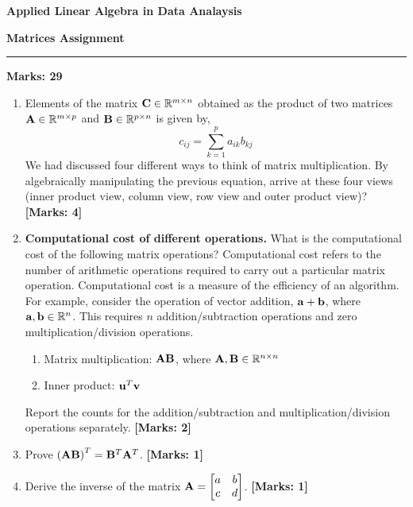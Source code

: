 \documentclass[12pt]{article}
\def\mf{\ensuremath\mathbf}
\def\mb{\ensuremath\mathbb}
\def\lp{\ensuremath\left(}
\def\rp{\ensuremath\right)}
\newcommand{\ct}[1]{\lp #1\rp}
\begin{document}
\begin{center}
    \begin{large}
        \textbf{Applied Linear Algebra in Data Analaysis}\\
        \vspace{0.1cm}
    \end{large}
    \textbf{Matrices Assignment}
\end{center}
\hrule
\vspace{1em}

\begin{large}
    \textbf{Marks: 29}
\end{large}

\begin{enumerate}
    \item Elements of the matrix $\mf{C} \in \mb{R}^{m \times n}$ obtained as the product of two matrices $\mf{A} \in \mb{R}^{m \times p}$ and $\mf{B} \in \mb{R}^{p \times n}$ is given by,
    \[ c_{ij} = \sum_{k=1}^{p}a_{ik}b_{kj} \]
    We had discussed four different ways to think of matrix multiplication. By algebraically manipulating the previous equation, arrive at these four views (inner product view, column view, row view and outer product view)?  \textbf{[Marks: 4]}
    
    \item \textbf{Computational cost of different operations.} What is the computational cost of the following matrix operations? Computational cost refers to the number of arithmetic operations  required to carry out a particular matrix operation. Computational cost is a measure of the efficiency of an algorithm. For example, consider the operation of vector addition, $\mf{a} + \mf{b}$, where $\mf{a}, \mf{b} \in \mb{R}^n$. This requires $n$ addition/subtraction operations and zero multiplication/division operations.
    \begin{enumerate}
        \item Matrix multiplication: $\mf{AB}$, where $\mf{A}, \mf{B} \in \mb{R}^{n \times n}$
        \item Inner product: $\mf{u}^T\mf{v}$
    \end{enumerate} 
    Report the counts for the addition/subtraction and multiplication/division operations separately. \textbf{[Marks: 2]}
    
    \item Prove $\ct{\mf{A}\mf{B}}^T = \mf{B}^T\mf{A}^T$.  \textbf{[Marks: 1]}
    
    \item Derive the inverse of the matrix $\mf{A} = \begin{bmatrix}a & b\\c & d\end{bmatrix}$.  \textbf{[Marks: 1]}
    

\end{enumerate}
\end{document}
